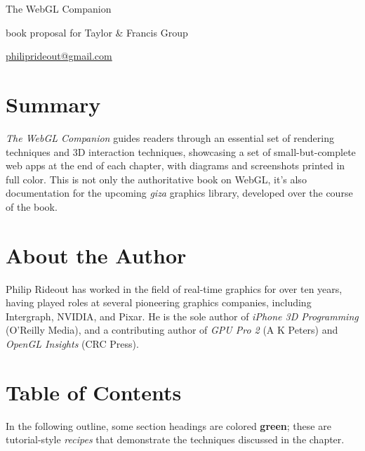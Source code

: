 \thispagestyle{empty}
\label{Proposal}
\LARGE

\noindent The WebGL Companion

\small

\vspace{0.25in}
\noindent book proposal for Taylor \& Francis Group

\noindent \href{mailto:philiprideout@gmail.com}{philiprideout@gmail.com}
\normalsize

\section*{Summary}
\emph{The WebGL Companion} guides readers through an essential set of rendering techniques and 3D interaction techniques, showcasing a set of small-but-complete web apps at the end of each chapter, with diagrams and screenshots printed in full color.  This is not only the authoritative book on WebGL, it's also documentation for the upcoming \emph{giza} graphics library, developed over the course of the book.

\section*{About the Author}

Philip Rideout has worked in the field of real-time graphics for over ten years, having played roles at several pioneering graphics companies, including Intergraph, NVIDIA, and Pixar.  He is the sole author of \emph{iPhone 3D Programming} (O'Reilly Media), and a contributing author of \emph{GPU Pro 2} (A K Peters) and \emph{OpenGL Insights} (CRC Press).

\section*{Table of Contents}


In the following outline, some section headings are colored \textbf{\textcolor{mygreen}{green}}; these are tutorial-style \emph{recipes} that demonstrate the techniques discussed in the chapter.

\newcommand{\rrecipe}[1] {\section{\textcolor{mygreen}{#1} } }
\hypersetup{colorlinks,linkcolor=black}
\newcommand{\summary}[1]{\addtocontents{toc}{\setlength{\leftskip}{15pt} \noindent  \footnotesize\textcolor{mygray}{#1}\normalsize\protect\par}}

